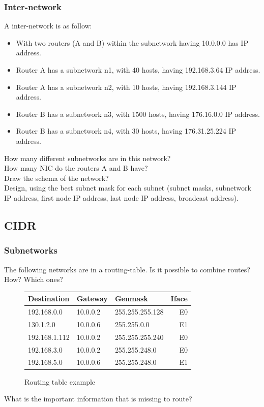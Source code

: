 \documentclass[11pt]{article}
\begin{document}
\subsubsection{Inter-network}
A inter-network is as follow:
\begin{itemize}
  \item With two routers (A and B) within the subnetwork having 10.0.0.0 has IP address.
  \item Router A has a subnetwork n1, with 40 hosts, having 192.168.3.64 IP address.
  \item Router A has a subnetwork n2, with 10 hosts, having 192.168.3.144 IP address.
  \item Router B has a subnetwork n3, with 1500 hosts, having 176.16.0.0 IP address.
  \item Router B has a subnetwork n4, with 30 hosts, having 176.31.25.224 IP address.
\end{itemize}

How many different subnetworks are in this network?\\
How many NIC do the routers A and B have?\\
Draw the schema of the network?\\
Design, using the best subnet mask for each subnet (subnet masks, subnetwork IP address, first node IP address, last node IP address, broadcast address).

\subsection{CIDR}
\subsubsection{Subnetworks}
The following networks are in a routing-table. Is it possible to combine routes? How? Which ones?
\begin{figure}[h]
  \centering
  \resizebox{10cm}{!} {
    \begin{tabular}{lllr}
      \textbf{Destination} & \textbf{Gateway} & \textbf{Genmask} & \textbf{Iface} \\ \hline
      192.168.0.0   & 10.0.0.2 & 255.255.255.128 & E0 \\
      130.1.2.0     & 10.0.0.6 & 255.255.0.0     & E1 \\
      192.168.1.112 & 10.0.0.2 & 255.255.255.240 & E0 \\
      192.168.3.0   & 10.0.0.2 & 255.255.248.0   & E0 \\
      192.168.5.0   & 10.0.0.6 & 255.255.248.0   & E1 \\
    \end{tabular}
  }
  \caption{Routing table example}
  \label{fig:rting-tbl}
\end{figure}
What is the important information that is missing to route?
\end{document}
